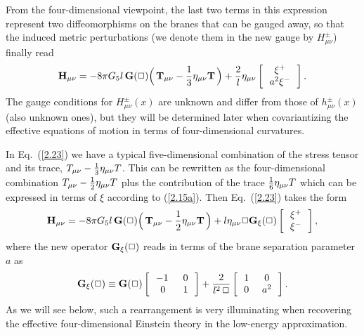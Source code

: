 \documentclass[a4paper,preprint,nofootinbib,
                 showpacs,preprintnumbers,amsmath,amssymb]{revtex4}
\begin{document}
 From the four-dimensional viewpoint, the last two terms in this 
expression represent two diffeomorphisms on the branes that can 
be gauged away, so that the induced metric perturbations (we denote 
them in the new gauge by $H^\pm_{\mu\nu}$) finally read 
    \begin{eqnarray} 
    {\bf H}_{\mu\nu}= 
    - 8 \pi G_5 l\,{\bf G}(\Box) 
    \Big(\,{\bf T}_{\mu \nu} 
      - \frac{1}{3} \eta_{\mu \nu} {\bf T}\,\Big) 
    +\frac2l\eta_{\mu\nu}\left[\begin{array}{c} 
      \,\xi^+\, \\ \, a^2\xi^-\, \end{array}\right].  \label{2.23} 
    \end{eqnarray} 
The gauge conditions for $H_{\mu\nu}^\pm(x)$ are unknown and 
differ from those of $h_{\mu\nu}^\pm(x)$ (also unknown ones), but 
they will be determined later when covariantizing the effective 
equations of motion in terms of four-dimensional curvatures. 
 
In Eq.~(\ref{2.23}) we have a typical five-dimensional combination of 
the stress tensor and its trace, 
$T_{\mu\nu}-{1\over3}\eta_{\mu\nu}T$. This can be rewritten as the 
four-dimensional combination $T_{\mu\nu}-{1\over2}\eta_{\mu\nu}T$ 
plus the contribution of the trace ${1\over6}\eta_{\mu\nu}T$ which 
can be expressed in terms of $\xi$ according to (\ref{2.15a}). 
Then Eq.~(\ref{2.23}) takes the form 
    \begin{eqnarray} 
    {\bf H}_{\mu\nu}= 
    - 8 \pi G_5 l\,{\bf G}(\Box) 
    \Big(\,{\bf T}_{\mu \nu} 
      - \frac{1}{2} \eta_{\mu \nu} {\bf T}\,\Big) 
    +l\eta_{\mu\nu}\Box{\bf G_\xi} 
    (\Box)\left[\begin{array}{c} 
    \,\xi^+\, \\ \,\xi^-\, \end{array}\right],  \label{2.23a} 
    \end{eqnarray} 
where the new operator ${\bf G_\xi}(\Box)$ reads in terms of the 
brane separation parameter $a$ as 
    \begin{eqnarray} 
    {\bf G_\xi}(\Box) \equiv {\bf G}(\Box) 
    \left[\begin{array}{cc} 
    \,-1\,\,&\,0\,\\ \,0\,&\,1\,\end{array}\right] 
    + \frac{2}{l^2\, 
    \Box}\left[\begin{array}{cc} 
    \,1\,&\,0\,\\ \,0\,&\,a^2\,\end{array}\right].  \label{2.24} 
    \end{eqnarray} 
As we will see below, such a rearrangement is very illuminating 
when recovering the effective four-dimensional Einstein theory in the 
low-energy approximation. 
 
\end{document}
